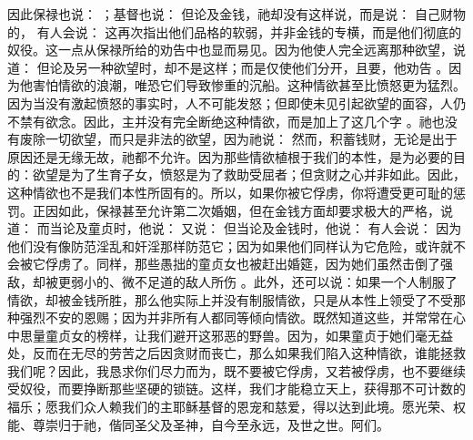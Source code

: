 因此保禄也说： ；基督也说：  但论及金钱，祂却没有这样说，而是说： 自己财物的，  有人会说： 这再次指出他们品格的软弱，并非金钱的专横，而是他们彻底的奴役。这一点从保禄所给的劝告中也显而易见。因为他使人完全远离那种欲望，说道：  但论及另一种欲望时，却不是这样；而是仅使他们分开，且要，他劝告 。因为他害怕情欲的浪潮，唯恐它们导致惨重的沉船。这种情欲甚至比愤怒更为猛烈。因为当没有激起愤怒的事实时，人不可能发怒；但即使未见引起欲望的面容，人仍不禁有欲念。因此，主并没有完全断绝这种情欲，而是加上了这几个字 。祂也没有废除一切欲望，而只是非法的欲望，因为祂说：  然而，积蓄钱财，无论是出于原因还是无缘无故，祂都不允许。因为那些情欲植根于我们的本性，是为必要的目的：欲望是为了生育子女，愤怒是为了救助受屈者；但贪财之心并非如此。因此，这种情欲也不是我们本性所固有的。所以，如果你被它俘虏，你将遭受更可耻的惩罚。正因如此，保禄甚至允许第二次婚姻，但在金钱方面却要求极大的严格，说道：  而当论及童贞时，他说：  又说：  但当论及金钱时，他说：  有人会说： 因为他们没有像防范淫乱和奸淫那样防范它；因为如果他们同样认为它危险，或许就不会被它俘虏了。同样，那些愚拙的童贞女也被赶出婚筵，因为她们虽然击倒了强敌，却被更弱小的、微不足道的敌人所伤 。此外，还可以说：如果一个人制服了情欲，却被金钱所胜，那么他实际上并没有制服情欲，只是从本性上领受了不受那种强烈不安的恩赐；因为并非所有人都同等倾向情欲。既然知道这些，并常常在心中思量童贞女的榜样，让我们避开这邪恶的野兽。因为，如果童贞于她们毫无益处，反而在无尽的劳苦之后因贪财而丧亡，那么如果我们陷入这种情欲，谁能拯救我们呢？因此，我恳求你们尽力而为，既不要被它俘虏，又若被俘虏，也不要继续受奴役，而要挣断那些坚硬的锁链。这样，我们才能稳立天上，获得那不可计数的福乐；愿我们众人赖我们的主耶稣基督的恩宠和慈爱，得以达到此境。愿光荣、权能、尊崇归于祂，偕同圣父及圣神，自今至永远，及世之世。阿们。\par

